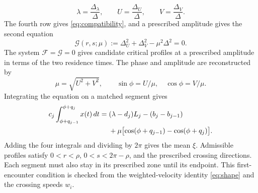 \documentclass[11pt,a4paper]{article}
\begin{document}
\[
 \lambda=\frac{\Delta_\lambda}{\Delta},\qquad
 U=\frac{\Delta_U}{\Delta},\qquad V=\frac{\Delta_V}{\Delta}.
\]
The fourth row gives \eqref{eq:compatibility}, and a prescribed amplitude
gives the second equation
\begin{equation}\label{eq:critical-amplitude}
 \mathcal G(r,s;\mu):=\Delta_U^2+\Delta_V^2-\mu^2\Delta^2=0.
\end{equation}
The system $\mathcal F=\mathcal G=0$ gives candidate critical profiles
at a prescribed amplitude in terms of the two residence times.
The phase and amplitude are reconstructed by
\begin{equation}\label{eq:amplitude-recovery}
 \mu=\sqrt{U^2+V^2},\qquad
 \sin\phi=U/\mu,\quad\cos\phi=V/\mu.
\end{equation}
Integrating the equation on a matched segment gives
\begin{align}\label{eq:matched-mean}
 c_j\int_{\phi+q_{j-1}}^{\phi+q_j}x(t)\,dt
 ={}&(\lambda-d_j)L_j-(b_j-b_{j-1})\\
 &+\mu\bigl[\cos(\phi+q_{j-1})-\cos(\phi+q_j)\bigr].\notag
\end{align}
Adding the four integrals and dividing by $2\pi$ gives the mean $\xi$.
Admissible profiles satisfy $0<r<\rho$, $0<s<2\pi-\rho$, and the prescribed
crossing directions. Each segment must also stay in its prescribed zone
until its endpoint. This first-encounter condition is checked from the
weighted-velocity identity \eqref{eq:shape} and the crossing speeds $w_i$.
\end{document}
